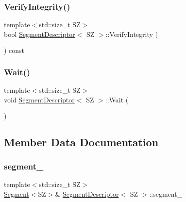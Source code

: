 \mbox{\label{classSegmentDescriptor_a2dd29d04ba59a348aa2188f86a5c3cff}} 
\subsubsection{\texorpdfstring{Verify\+Integrity()}{VerifyIntegrity()}}
{\footnotesize\ttfamily template$<$std\+::size\+\_\+t SZ$>$ \\
bool \hyperlink{classSegmentDescriptor}{Segment\+Descriptor}$<$ SZ $>$\+::Verify\+Integrity (\begin{DoxyParamCaption}{ }\end{DoxyParamCaption}) const\hspace{0.3cm}{\ttfamily [inline]}}

\mbox{\label{classSegmentDescriptor_a253f68680c02ea71b6504f5ce9dba741}} 
\subsubsection{\texorpdfstring{Wait()}{Wait()}}
{\footnotesize\ttfamily template$<$std\+::size\+\_\+t SZ$>$ \\
void \hyperlink{classSegmentDescriptor}{Segment\+Descriptor}$<$ SZ $>$\+::Wait (\begin{DoxyParamCaption}{ }\end{DoxyParamCaption})\hspace{0.3cm}{\ttfamily [inline]}}



\subsection{Member Data Documentation}
\mbox{\label{classSegmentDescriptor_ad0c2fdf75d6c44f0b01e3e8f7a7a5977}} 
\subsubsection{\texorpdfstring{segment\+\_\+}{segment\_}}
{\footnotesize\ttfamily template$<$std\+::size\+\_\+t SZ$>$ \\
\hyperlink{classSegment}{Segment}$<$SZ$>$\& \hyperlink{classSegmentDescriptor}{Segment\+Descriptor}$<$ SZ $>$\+::segment\+\_\+\hspace{0.3cm}{\ttfamily [private]}}

